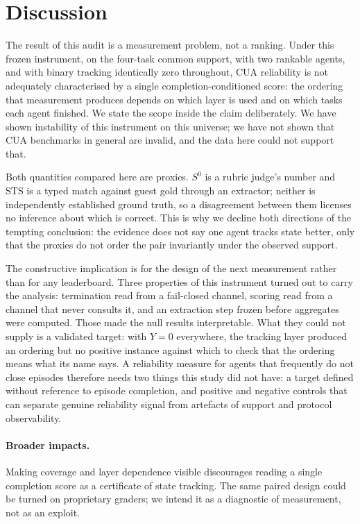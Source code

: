 \documentclass{article}
\newcommand{\STS}{\mathrm{STS}}
\begin{document}
\section{Discussion}

The result of this audit is a measurement problem, not a ranking.
Under this frozen instrument, on the four-task common support, with two rankable agents, and with binary tracking identically zero throughout, CUA reliability is not adequately characterised by a single completion-conditioned score: the ordering that measurement produces depends on which layer is used and on which tasks each agent finished.
We state the scope inside the claim deliberately.
We have shown instability of this instrument on this universe; we have not shown that CUA benchmarks in general are invalid, and the data here could not support that.

Both quantities compared here are proxies.
$S^{0}$ is a rubric judge's number and $\STS$ is a typed match against guest gold through an extractor; neither is independently established ground truth, so a disagreement between them licenses no inference about which is correct.
This is why we decline both directions of the tempting conclusion: the evidence does not say one agent tracks state better, only that the proxies do not order the pair invariantly under the observed support.

The constructive implication is for the design of the next measurement rather than for any leaderboard.
Three properties of this instrument turned out to carry the analysis: termination read from a fail-closed channel, scoring read from a channel that never consults it, and an extraction step frozen before aggregates were computed.
Those made the null results interpretable.
What they could not supply is a validated target: with $Y=0$ everywhere, the tracking layer produced an ordering but no positive instance against which to check that the ordering means what its name says.
A reliability measure for agents that frequently do not close episodes therefore needs two things this study did not have: a target defined without reference to episode completion, and positive and negative controls that can separate genuine reliability signal from artefacts of support and protocol observability.

\paragraph{Broader impacts.}
Making coverage and layer dependence visible discourages reading a single completion score as a certificate of state tracking.
The same paired design could be turned on proprietary graders; we intend it as a diagnostic of measurement, not as an exploit.
\end{document}
